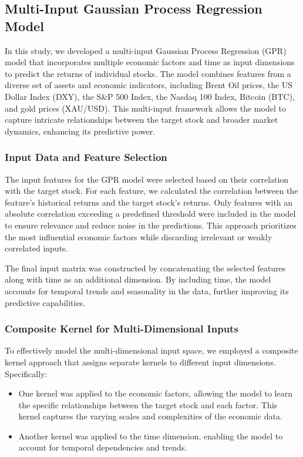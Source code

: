 \subsection{Multi-Input Gaussian Process Regression Model}

In this study, we developed a multi-input Gaussian Process Regression (GPR) model that incorporates multiple economic factors and time as input dimensions to predict the returns of individual stocks. The model combines features from a diverse set of assets and economic indicators, including Brent Oil prices, the US Dollar Index (DXY), the S\&P 500 Index, the Nasdaq 100 Index, Bitcoin (BTC), and gold prices (XAU/USD). This multi-input framework allows the model to capture intricate relationships between the target stock and broader market dynamics, enhancing its predictive power.

\subsubsection{Input Data and Feature Selection}

The input features for the GPR model were selected based on their correlation with the target stock. For each feature, we calculated the correlation between the feature's historical returns and the target stock's returns. Only features with an absolute correlation exceeding a predefined threshold were included in the model to ensure relevance and reduce noise in the predictions. This approach prioritizes the most influential economic factors while discarding irrelevant or weakly correlated inputs.

The final input matrix was constructed by concatenating the selected features along with time as an additional dimension. By including time, the model accounts for temporal trends and seasonality in the data, further improving its predictive capabilities.

\subsubsection{Composite Kernel for Multi-Dimensional Inputs}

To effectively model the multi-dimensional input space, we employed a composite kernel approach that assigns separate kernels to different input dimensions. Specifically:

\begin{itemize}
    \item One kernel was applied to the economic factors, allowing the model to learn the specific relationships between the target stock and each factor. This kernel captures the varying scales and complexities of the economic data.
    \item Another kernel was applied to the time dimension, enabling the model to account for temporal dependencies and trends. 
\end{itemize}

